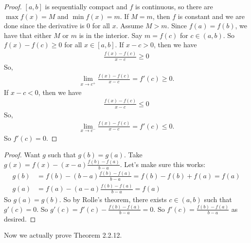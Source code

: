 \documentclass{report}
\begin{document}
\begin{proof}
    $[a,b]$ is sequentially compact and $f$ is continuous, so there are $\max f(x) = M$ and $\min f(x) = m$. If $M = m$, then $f$ is constant and we are done since the derivative is 0 for all $x$. Assume $M > m$. Since $f(a) = f(b)$, we have that either $M$ or $m$ is in the interior. Say $m = f(c)$ for $c \in (a, b)$. So $f(x) - f(c) \geq 0$ for all $x \in [a, b]$. If $x  -c  > 0$, then we have 
    \begin{align*}
        \frac{f(x) - f(c)}{x - c} \geq 0
    \end{align*}
    So,
    \begin{align*}
        \lim_{x \to c^+} \frac{f(x) - f(c)}{x - c} = f'(c) \geq 0.
    \end{align*}
    If $x - c < 0$, then we have
    \begin{align*}
        \frac{f(x) - f(c)}{x - c} \leq 0
    \end{align*}
    So,
    \begin{align*}
        \lim_{x \to c^-} \frac{f(x) - f(c)}{x - c} = f'(c) \leq 0.
    \end{align*}
    So $f'(c) = 0$.
\end{proof}
\begin{proof}
    Want $g$ such that $g(b) = g(a)$. Take $g(x) = f(x) - (x - a)\frac{f(b) - f(a)}{b-a}$. Let's make sure this works:
    \begin{align*}
        g(b) &= f(b) - (b - a)\frac{f(b) - f(a)}{b-a} = f(b) - f(b) + f(a) = f(a) \\
        g(a) &= f(a) - (a - a)\frac{f(b) - f(a)}{b-a} = f(a)
    \end{align*}
    So $g(a) = g(b)$. So by Rolle's theorem, there exists $c \in (a, b)$ such that $g'(c) = 0$. So $g'(c) = f'(c) - \frac{f(b) - f(a)}{b-a} = 0$. So $f'(c) = \frac{f(b) - f(a)}{b-a}$ as desired.
\end{proof}
Now we actually prove Theorem 2.2.12.
\end{document}
